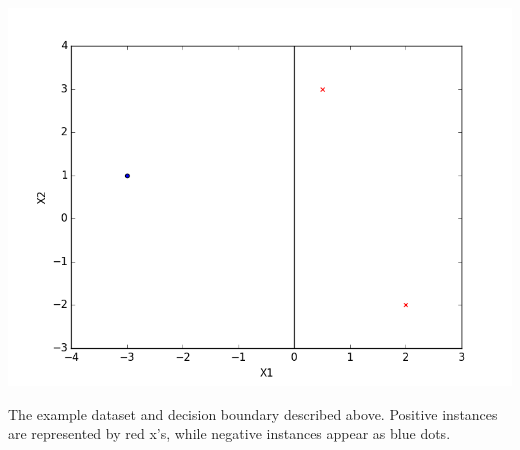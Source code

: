 \begin{center}
  \includegraphics[width=.8\textwidth]{./images/SimpleDatasetWithDecisionBoundary.png}
\end{center}
\begin{small}
  The example dataset and decision boundary described above. Positive instances are
  represented by red x's, while negative instances appear as blue dots.
\end{small}

